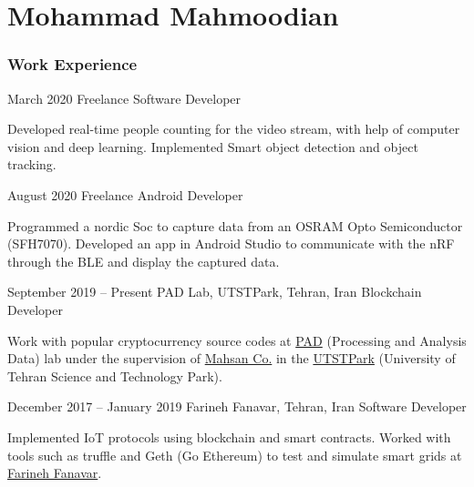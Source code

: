 \documentclass{tccv}
\begin{document}
\part{Mohammad Mahmoodian}

\section{Work Experience}

\begin{eventlist}

\item{March 2020}
	{Freelance}
	{Software Developer}

	Developed real-time people counting for the video stream, with help of computer vision and deep learning. Implemented Smart object detection and object tracking.

\item{August 2020}
	{Freelance}
	{Android Developer}

	Programmed a nordic Soc to capture data from an OSRAM Opto Semiconductor (SFH7070). Developed an app in Android Studio to communicate with the nRF through the BLE and display the captured data.

%


\item{September 2019 -- Present}
     {PAD Lab, UTSTPark, Tehran, Iran}
     {Blockchain Developer}
     
	Work with popular cryptocurrency source codes at \href{www.padlab.ir}{PAD} (Processing and Analysis Data) lab under the supervision of \href{www.mahsan.co}{Mahsan Co.} in the \href{www.utstpark.ir}{UTSTPark} (University of Tehran Science and Technology Park).

%

%

\item{December 2017 -- January 2019}
     {Farineh Fanavar, Tehran, Iran}
     {Software Developer}

	Implemented IoT protocols using blockchain and smart contracts. Worked with tools such as truffle and Geth (Go Ethereum) to test and simulate smart grids at \href{http://farinehtech.com/}{Farineh Fanavar}.

\end{eventlist}
\end{document}
